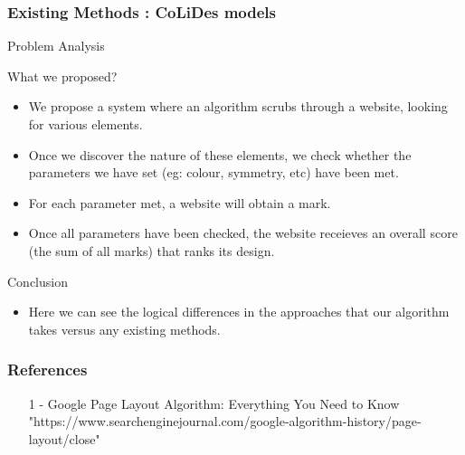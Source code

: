 \documentclass[11pt]{beamer}
\begin{document}
\begin{frame}
	\frametitle{{Existing Methods : CoLiDes models}}
\end{frame}
	\begin{frame}{Problem Analysis}
		\end{frame}
		\begin{frame}{What we proposed?}
			\begin{itemize}
				\item We propose a system where an algorithm scrubs through a website, looking for various elements.
				\item Once we discover the nature of these elements, we check whether the parameters we have set (eg: colour, symmetry, etc) have been met.
				\item For each parameter met, a website will obtain a mark.
				\item Once all parameters have been checked, the website receieves an overall score (the sum of all marks) that ranks its design.
					\end{itemize}	
	\end{frame}
	\begin{frame}{Conclusion}
		\begin{itemize}
			\item Here we can see the logical differences in the approaches that our algorithm takes versus any existing methods.
		\end{itemize}
	\end{frame}
	\begin{frame}
		\frametitle{\LARGE \textbf{References}}
		\begin{itemize}
			\item [1] - Google Page Layout Algorithm: Everything You Need to Know 
			"https://www.searchenginejournal.com/google-algorithm-history/page-layout/close"
		\end{itemize}
	\end{frame}
\end{document}
